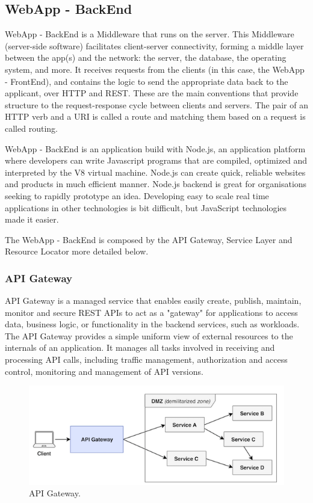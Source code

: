 \subsection{WebApp - BackEnd}\label{sec:WebAppBackEnd}
WebApp - BackEnd is a Middleware that runs on the server. This Middleware (server-side software) facilitates client-server connectivity, forming a middle layer between the app(s) and the network: the server, the database, the operating system, and more. It receives requests from the clients (in this case, the WebApp - FrontEnd), and contains the logic to send the appropriate data back to the applicant, over HTTP and REST.  These are the main conventions that provide structure to the request-response cycle between clients and servers. The pair of an HTTP verb and a URI is called a route and matching them based on a request is called routing.

WebApp - BackEnd is an application build with Node.js, an application platform where developers can write Javascript programs that are compiled, optimized and interpreted by the V8 virtual machine. Node.js can create quick, reliable websites and products in much efficient manner. Node.js backend is great for organisations seeking to rapidly prototype an idea. Developing easy to scale real time applications in other technologies is bit difficult, but JavaScript technologies made it easier.

The WebApp - BackEnd is composed by the API Gateway, Service Layer and Resource Locator more detailed below.

\subsubsection{API Gateway}\label{sec:APIGateway}
API Gateway is a managed service that enables easily create, publish, maintain, monitor and secure REST APIs to act as a "gateway" for applications to access data, business logic, or functionality in the backend services, such as workloads. The API Gateway provides a simple uniform view of external resources to the internals of an application. It manages all tasks involved in receiving and processing API calls, including traffic management, authorization and access control, monitoring and management of API versions.

\begin{figure}[htbp]
\begin{center}
  \includegraphics[scale=0.75]{images/apigateway.png}
\caption{API Gateway.}
\label{default-regular2}
\end{center}
\end{figure}

